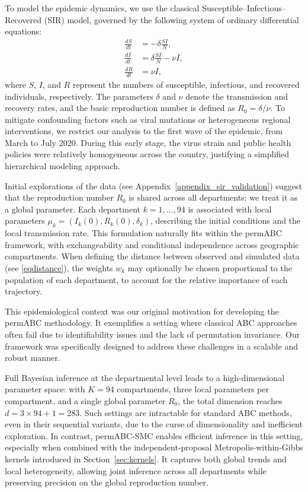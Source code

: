 \documentclass[11pt,a4paper]{article}
\def\locparam{\mu}
\theoremstyle{plain}
\theoremstyle{definition}
\theoremstyle{remark}
\begin{document}
To model the epidemic dynamics, we use the classical Susceptible–Infectious–Recovered (SIR) model, governed by the following system of ordinary differential equations:
\begin{equation}
    \label{eqSIR}
    \begin{split}
        \frac{dS}{dt} &= -\delta \frac{SI}{N},\\
        \frac{dI}{dt} &= \delta \frac{SI}{N} - \nu I,\\
        \frac{dR}{dt} &= \nu I,
    \end{split}
\end{equation}
where \( S \), \( I \), and \( R \) represent the numbers of susceptible, infectious, and recovered individuals, respectively. The parameters \( \delta \) and \( \nu \) denote the transmission and recovery rates, and the basic reproduction number is defined as \( R_0 = \delta / \nu \). 
To mitigate confounding factors such as viral mutations or heterogeneous regional interventions, we restrict our analysis to the first wave of the epidemic, from March to July 2020. During this early stage, the virus strain and public health policies were relatively homogeneous across the country, justifying a simplified hierarchical modeling approach.

Initial explorations of the data (see Appendix~\ref{appendix_sir_validation}) suggest that the reproduction number \( R_0 \) is shared across all departments: we treat it as a global parameter. Each department \( k =  1, \dots, 94 \) is associated with local parameters \( \locparam_k = (I_k(0), R_k(0), \delta_k) \), describing the initial conditions and the local transmission rate. This formulation naturally fits within the permABC framework, with exchangeability and conditional independence across geographic compartments. When defining the distance between observed and simulated data (see \eqref{eqdistance}), the weights \( w_k \) may optionally be chosen proportional to the population of each department, to account for the relative importance of each trajectory.

This epidemiological context was our original motivation for developing the permABC methodology. It exemplifies a setting where classical ABC approaches often fail due to identifiability issues and the lack of permutation invariance. Our framework was specifically designed to address these challenges in a scalable and robust manner.

Full Bayesian inference at the departmental level leads to a high-dimensional parameter space: with \( K = 94 \) compartments, three local parameters per compartment, and a single global parameter \( R_0 \), the total dimension reaches \( d = 3 \times 94 + 1 = 283 \). Such settings are intractable for standard ABC methods, even in their sequential variants, due to the curse of dimensionality and inefficient exploration. 
In contrast, permABC-SMC enables efficient inference in this setting, especially when combined with the independent-proposal Metropolis-within-Gibbs kernels introduced in Section~\ref{sec:kernels}. It captures both global trends and local heterogeneity, allowing joint inference across all departments while preserving precision on the global reproduction number.
\end{document}

